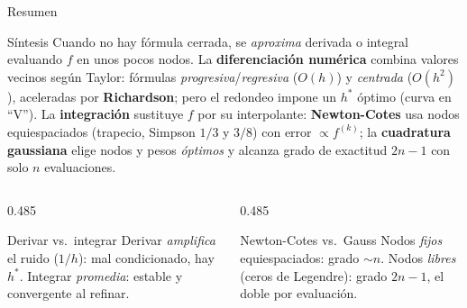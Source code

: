 \documentclass[aspectratio=169,10pt]{beamer}
\begin{document}
\begin{frame}{Resumen}
\begin{cardidea}{Síntesis}{\faLightbulb}
Cuando no hay fórmula cerrada, se \emph{aproxima} derivada o integral evaluando $f$ en unos pocos nodos. La \textbf{diferenciación numérica} combina valores vecinos según Taylor: fórmulas \emph{progresiva}/\emph{regresiva} ($O(h)$) y \emph{centrada} ($O(h^2)$), aceleradas por \textbf{Richardson}; pero el redondeo impone un $h^*$ óptimo (curva en ``V''). La \textbf{integración} sustituye $f$ por su interpolante: \textbf{Newton-Cotes} usa nodos equiespaciados (trapecio, Simpson $1/3$ y $3/8$) con error $\propto f^{(k)}$; la \textbf{cuadratura gaussiana} elige nodos y pesos \emph{óptimos} y alcanza grado de exactitud $2n-1$ con solo $n$ evaluaciones.
\end{cardidea}
\vspace{2mm}
\begin{columns}[T]
\begin{column}{0.485\textwidth}
\begin{cardgear}{Derivar vs.\ integrar}{\faCogs}
Derivar \emph{amplifica} el ruido ($1/h$): mal condicionado, hay $h^*$. Integrar \emph{promedia}: estable y convergente al refinar.
\end{cardgear}
\end{column}
\begin{column}{0.485\textwidth}
\begin{cardgear}{Newton-Cotes vs.\ Gauss}{\faCogs}
Nodos \emph{fijos} equiespaciados: grado $\sim n$. Nodos \emph{libres} (ceros de Legendre): grado $2n-1$, el doble por evaluación.
\end{cardgear}
\end{column}
\end{columns}
\end{frame}
\end{document}
